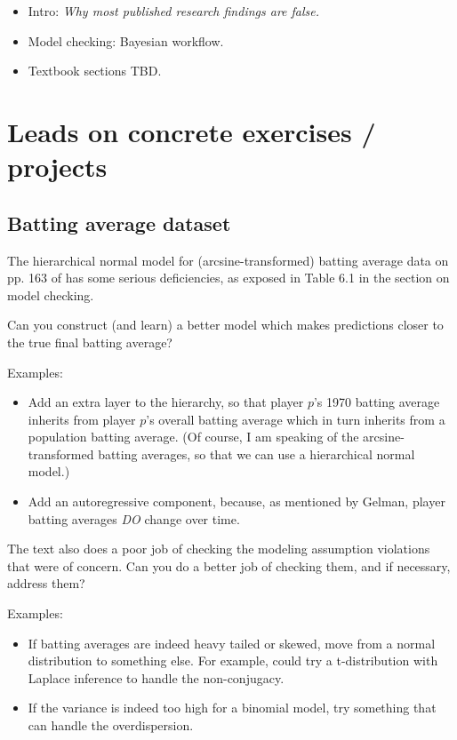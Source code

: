 \documentclass{article} %
\begin{document}
\begin{itemize}
\item Intro: \textit{Why most published research findings are false. } \cite{ioannidis2005most}
\item Model checking: Bayesian workflow.
\item Textbook sections TBD. 
\end{itemize}

\section{Leads on concrete exercises / projects}

\subsection{Batting average dataset}

The hierarchical normal model for (arcsine-transformed) batting average data on pp.  163 of \cite{gelman2013bayesian} has some serious deficiencies,  as exposed in Table 6.1 in the section on model checking.    

Can you construct (and learn) a better model which makes predictions closer to the true final batting average?
 
Examples:
\begin{itemize}
\item Add an extra layer to the hierarchy,  so that player $p$'s 1970 batting average inherits from player $p$'s overall batting average which in turn inherits from a population batting average.  (Of course,  I am speaking of the arcsine-transformed batting averages,  so that we can use a hierarchical normal model.)
\item Add an autoregressive component, because,  as mentioned by Gelman,  player batting averages \textit{DO} change over time. 
\end{itemize}

The text also does a poor job of checking the modeling assumption violations that were of concern.   Can you do a better job of checking them,  and if necessary,  address them?

Examples:
\begin{itemize}
\item If batting averages are indeed heavy tailed or skewed,  move from a normal distribution to something else.   For example,  could try a t-distribution with Laplace inference to handle the non-conjugacy. 
\item If the variance is indeed too high for a binomial model,  try something that can handle the overdispersion. 
\end{itemize}
\end{document}
